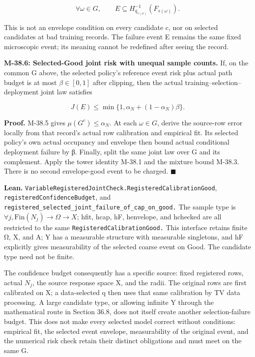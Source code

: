 \documentclass[
  english,
  11pt,
  oneside]{book}
\begin{document}
\[\forall\omega\in G,\qquad
E\subseteq H_{q_{s(\omega)}}^{-1}(F_{s(\omega)}).\]

This is not an envelope condition on every candidate c, nor on selected candidates at bad training records. The failure event E remains the same fixed microscopic event; its meaning cannot be redefined after seeing the record.

\hypertarget{m-38-6}{}\label{m-38-6}

\textbf{M-38.6: Selected-Good joint risk with unequal sample counts.} If, on the common G above, the selected policy's reference event risk plus actual path budget is at most \(\beta\in[0,1]\) after clipping, then the actual training--selection--deployment joint law satisfies

\[J(E)\le \min\{1,\alpha_N+(1-\alpha_N)\beta\}.\]

\textbf{Proof.} M-38.5 gives \(\mu(G^c)\le\alpha_N\). At each \(\omega\in G\), derive the source-row error locally from that record's actual row calibration and empirical fit. Its selected policy's own actual occupancy and envelope then bound actual conditional deployment failure by β. Finally, split the same joint law over G and its complement. Apply the tower identity M-38.1 and the mixture bound M-38.3. There is no second envelope-good event to be charged. \(\blacksquare\)

\textbf{Lean.} \nolinkurl{VariableRegisteredJointCheck.RegisteredCalibrationGood}, \nolinkurl{registeredConfidenceBudget}, and \nolinkurl{registered_selected_joint_failure_of_cap_on_good.} The sample type is \(\forall j,\mathrm{Fin}(N_j)\to\Omega\to X\); hfit, hcap, hF, henvelope, and hchecked are all restricted to the same \nolinkurl{RegisteredCalibrationGood.} This interface retains finite Ω, X, and A; Y has a measurable structure with measurable singletons, and hF explicitly gives measurability of the selected coarse event on Good. The candidate type need not be finite.

The confidence budget consequently has a specific source: fixed registered rows, actual \(N_j\), the source response space X, and the radii. The original rows are first calibrated on X; a data-selected q then uses that same calibration by TV data processing. A large candidate type, or allowing infinite Y through the mathematical route in Section 36.8, does not itself create another selection-failure budget. This does not make every selected model correct without conditions: empirical fit, the selected event envelope, measurability of the original event, and the numerical risk check retain their distinct obligations and must meet on the same G.
\end{document}
